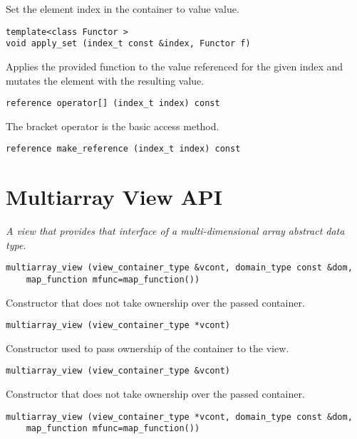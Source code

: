 Set the element index in the container to value value.

\begin{verbatim}
template<class Functor >
void apply_set (index_t const &index, Functor f)
\end{verbatim}

Applies the provided function to the value referenced for the given index and mutates the element with the resulting value.

\begin{verbatim}
reference operator[] (index_t index) const
\end{verbatim}

The bracket operator is the basic access method.

\begin{verbatim}
reference make_reference (index_t index) const
\end{verbatim}

\section{Multiarray View API } \label{sec-multi-vw}

\emph{ A view that provides that interface of a multi-dimensional array abstract data type.}

\begin{verbatim}
multiarray_view (view_container_type &vcont, domain_type const &dom,
    map_function mfunc=map_function())
\end{verbatim}

Constructor that does not take ownership over the passed container.

\begin{verbatim}
multiarray_view (view_container_type *vcont)
\end{verbatim}

Constructor used to pass ownership of the container to the view.

\begin{verbatim}
multiarray_view (view_container_type &vcont)
\end{verbatim}

Constructor that does not take ownership over the passed container.

\begin{verbatim}
multiarray_view (view_container_type *vcont, domain_type const &dom,
    map_function mfunc=map_function())
\end{verbatim}


